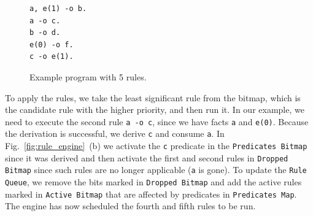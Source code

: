 \begin{figure}
\begin{Verbatim}
a, e(1) -o b.
a -o c.
b -o d.
e(0) -o f.
c -o e(1).
\end{Verbatim}
\caption{Example program with 5 rules.}
\label{code:5rules}
\end{figure}

To apply the rules, we take the least significant rule from the bitmap, which is the candidate rule with the higher priority, and then run it. In our example, we need to execute the second rule \texttt{a -o c}, since we have facts \texttt{a} and \texttt{e(0)}.
Because the derivation is successful, we derive \texttt{c} and consume \texttt{a}. In Fig.~\ref{fig:rule_engine}~(b) we
activate the \texttt{c} predicate in the \texttt{Predicates Bitmap} since it was derived and then activate the first and second rules
in \texttt{Dropped Bitmap} since such rules are no longer applicable (\texttt{a} is gone). To update the \texttt{Rule Queue},
we remove the bits marked in \texttt{Dropped Bitmap} and add the active rules marked in \texttt{Active Bitmap} that are affected
by predicates in \texttt{Predicates Map}. The engine has now scheduled the fourth and fifth rules to be run.


